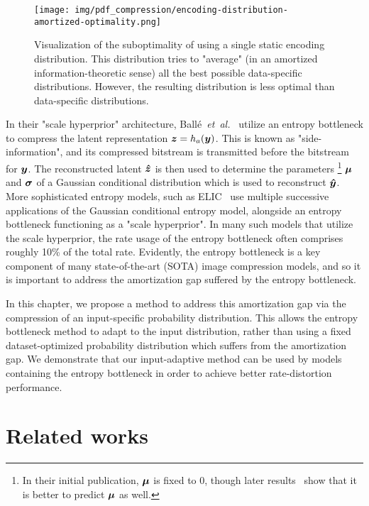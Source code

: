 \begin{figure}[htbp]
  \centering
  \texttt{[image: img/pdf\_compression/encoding-distribution-amortized-optimality.png]}
  \caption[Suboptimality of static amortized encoding distributions]{%
    Visualization of the suboptimality of using a single static encoding distribution.
    This distribution tries to "average" (in an amortized information-theoretic sense) all the best possible data-specific distributions.
    However, the resulting distribution is less optimal than data-specific distributions.%
  }
  \label{fig:pdf/amortization-gap}
\end{figure}


In their "scale hyperprior" architecture, Ballé~\emph{et~al.}~\cite{balle2018variational} utilize an entropy bottleneck to compress the latent representation ${\boldsymbol{z}} = h_a({\boldsymbol{y}})$.
This is known as "side-information", and its compressed bitstream is transmitted before the bitstream for ${\boldsymbol{y}}$.
The reconstructed latent ${\boldsymbol{\hat{z}}}$ is then used to determine the parameters%
\footnote{In their initial publication, ${\boldsymbol{\mu}}$ is fixed to $0$, though later results~\cite{minnen2018joint} show that it is better to predict ${\boldsymbol{\mu}}$ as well.}
${\boldsymbol{\mu}}$ and ${\boldsymbol{\sigma}}$ of a Gaussian conditional distribution which is used to reconstruct ${\boldsymbol{\hat{y}}}$.
More sophisticated entropy models, such as ELIC~\cite{he2022elic} use multiple successive applications of the Gaussian conditional entropy model, alongside an entropy bottleneck functioning as a "scale hyperprior".
In many such models that utilize the scale hyperprior, the rate usage of the entropy bottleneck often comprises roughly 10\% of the total rate.
Evidently, the entropy bottleneck is a key component of many state-of-the-art (SOTA) image compression models, and so it is important to address the amortization gap suffered by the entropy bottleneck.

In this chapter, we propose a method to address this amortization gap via the compression of an input-specific probability distribution. %
This allows the entropy bottleneck method to adapt to the input distribution, rather than using a fixed dataset-optimized probability distribution which suffers from the amortization gap.
We demonstrate that our input-adaptive method can be used by models containing the entropy bottleneck in order to achieve better rate-distortion performance.




\section{Related works}
\label{sec:pdf_compression/related}

